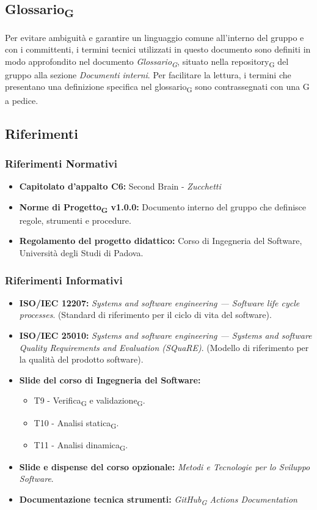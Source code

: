 \documentclass[11pt,a4paper]{article}
\newcommand{\gls}[1]{#1\textsubscript{G}}
\begin{document}
\subsection{\gls{Glossario}}
Per evitare ambiguità e garantire un linguaggio comune all'interno del gruppo e con i committenti, i termini tecnici utilizzati in questo documento sono definiti in modo approfondito nel documento \textit{\gls{Glossario}}, situato nella \gls{repository} del gruppo alla sezione \textit{Documenti interni}. Per facilitare la lettura, i termini che presentano una definizione specifica nel \gls{glossario} sono contrassegnati con una G a pedice.

\subsection{Riferimenti}
\subsubsection{Riferimenti Normativi}
\begin{itemize}
    \item \textbf{Capitolato d'appalto C6:} Second Brain - \textit{Zucchetti}
    \item \textbf{\gls{Norme di Progetto} v1.0.0:} Documento interno del gruppo che definisce regole, strumenti e procedure.
    \item \textbf{Regolamento del progetto didattico:} Corso di Ingegneria del Software, Università degli Studi di Padova.
\end{itemize}

\subsubsection{Riferimenti Informativi}
\begin{itemize}
    \item \textbf{ISO/IEC 12207:} \textit{Systems and software engineering — Software life cycle processes}. (Standard di riferimento per il ciclo di vita del software).
    \item \textbf{ISO/IEC 25010:} \textit{Systems and software engineering — Systems and software Quality Requirements and Evaluation (SQuaRE)}. (Modello di riferimento per la qualità del prodotto software).
    \item \textbf{Slide del corso di Ingegneria del Software:}
    \begin{itemize}
        \item T9 - \gls{Verifica} e \gls{validazione}.
        \item T10 - \gls{Analisi statica}.
        \item T11 - \gls{Analisi dinamica}.
    \end{itemize}
    \item \textbf{Slide e dispense del corso opzionale:} \textit{Metodi e Tecnologie per lo Sviluppo Software}.
    \item \textbf{Documentazione tecnica strumenti:} \textit{\gls{GitHub} Actions Documentation}
\end{itemize}
\end{document}
